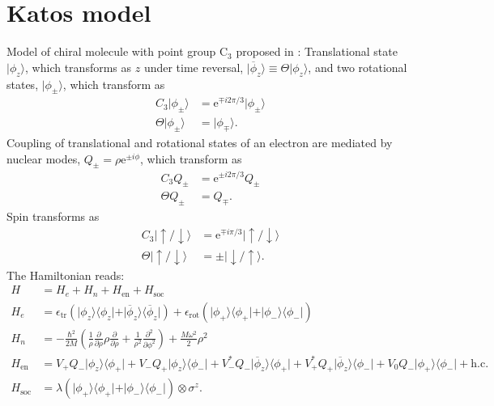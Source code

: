 \documentclass{article}
\newcommand{\exP}[1]{\mathrm{e}^{#1}}
\newcommand{\state}[1]{\vert #1\rangle}
\newcommand{\outerp}[2]{\vert #1\rangle\!\langle #2 \vert}
\begin{document}
\section{Katos model}
Model of chiral molecule with point group C$_3$ proposed in \cite{kato2022chirality}: Translational state $\state{\phi_z}$, which transforms as $z$ under time reversal, $\state{\overline{\phi}_z}\equiv \Theta \state{\phi_z}$, and two rotational states, $\state{\phi_\pm}$, which transform as 
\begin{align}
	C_3 \state{\phi_\pm}&= \exP{\mp i2\pi/3} \state{\phi_\pm}\\
	\Theta \state{\phi_\pm}&= \state{\phi_\mp}.
\end{align}
Coupling of translational and rotational states of an electron are mediated by nuclear modes, $Q_\pm=\rho \exP{\pm i\phi}$, which transform as
\begin{align}
	C_3 Q_\pm &= \exP{\pm i2\pi/3}Q_\pm\\
	\Theta Q_\pm &= Q_\mp.
\end{align}  
Spin transforms as
\begin{align}
	C_3 \state{\uparrow/\downarrow}&= \exP{\mp i\pi/3} \state{\uparrow/\downarrow}\\
	\Theta \state{\uparrow/\downarrow}&= \pm\state{\downarrow/\uparrow}.
\end{align}
The Hamiltonian reads:
\begin{align}
	H&= H_e+ H_n + H_\mathrm{en}+H_\mathrm{soc}\\
	H_e &= \epsilon_\mathrm{tr}(\outerp{\phi_z}{\phi_z}+\outerp{\overline{\phi}_z}{\overline{\phi}_z})+\epsilon_\mathrm{rot}(\outerp{\phi_+}{\phi_+}+\outerp{\phi_-}{\phi_-})\\
	H_n &= -\frac{\hbar^2}{2M}\left(\frac{1}{\rho}\frac{\partial}{\partial\rho}\rho\frac{\partial}{\partial \rho} + \frac{1}{\rho^2}\frac{\partial^2}{\partial \phi^2}\right)+\frac{M\omega^2}{2}\rho^2\\
	H_\mathrm{en}&= V_+Q_- \outerp{\phi_z}{\phi_+} + V_-Q_+ \outerp{\phi_z}{\phi_-} + V_-^*Q_- \outerp{\overline{\phi}_z}{\phi_+}+ V_+^*Q_+ \outerp{\overline{\phi}_z}{\phi_-} +V_0Q_- \outerp{\phi_+}{\phi_-} +\mathrm{h.c.} \\
	H_\mathrm{soc}&= \lambda (\outerp{\phi_+}{\phi_+} + \outerp{\phi_-}{\phi_-})\otimes \sigma^z.
\end{align}
\end{document}
